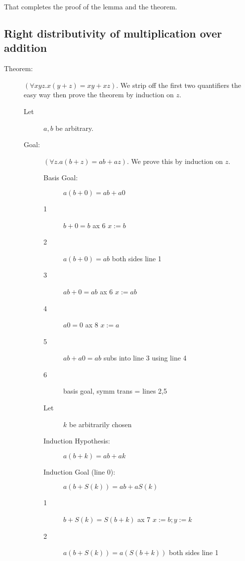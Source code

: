 \documentclass[12pt]{article}
\begin{document}
That completes the proof of the lemma and the theorem.

\subsection{Right distributivity of multiplication over addition}

\begin{description}

\item[Theorem:]  $(\forall xyz.x(y+z)=xy+xz)$.  We strip off the first two quantifiers the easy way then prove the theorem by induction on $z$.

\begin{description}

\item[Let]  $a,b$ be arbitrary.

\item[Goal:]  $(\forall z.a(b+z)=ab+az)$.  We prove this by induction on $z$.

\begin{description}

\item[Basis Goal:]  $a(b+0) = ab+a0$

\item[1]  $b+0=b$  ax 6 $x:=b$

\item[2]  $a(b+0) = ab$  both sides line 1

\item[3]  $ab+0=ab$  ax 6 $x:=ab$

\item[4]  $a0=0$  ax 8 $x:=a$

\item[5]  $ab+a0=ab$   subs into line 3 using line 4

\item[6]  basis goal, symm trans = lines 2,5

\item[Let]  $k$ be arbitrarily chosen

\item[Induction Hypothesis:]  $a(b+k)=ab+ak$

\item[Induction Goal (line 0):]  $a(b+S(k)) = ab+aS(k)$

\item[1]  $b+S(k)=S(b+k)$  ax 7 $x:=b; y:=k$

\item[2]  $a(b+S(k)) = a(S(b+k))$  both sides line 1


\end{description}
\end{description}
\end{description}
\end{document}
